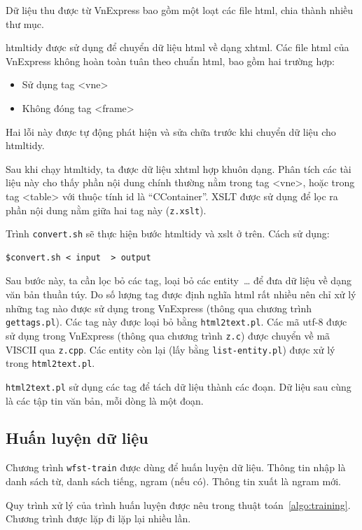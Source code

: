 \documentclass[a4paper,oneside,14pt]{extbook} %
\begin{document}
Dữ liệu thu được từ VnExpress bao gồm một loạt các file html, chia
thành nhiều thư mục.

htmltidy được sử dụng để chuyển dữ liệu html về dạng xhtml. Các file
html của VnExpress không hoàn toàn tuân theo chuẩn html, bao gồm hai
trường hợp:

\begin{itemize}
\item Sử dụng tag <vne>
\item Không đóng tag <frame>
\end{itemize}

Hai lỗi này được tự động phát hiện và sửa chữa trước khi chuyển dữ
liệu cho htmltidy.

Sau khi chạy htmltidy, ta được dữ liệu xhtml hợp khuôn dạng. Phân tích
các tài liệu này cho thấy phần nội dung chính thường nằm trong tag
<vne>, hoặc trong tag <table> với thuộc tính id là
``CContainer''. XSLT được sử dụng để lọc ra phần nội dung nằm giữa hai
tag này (\verb#z.xslt#).

Trình \verb#convert.sh# sẽ thực hiện bước htmltidy và xslt ở trên. Cách sử
dụng:
\begin{verbatim}
$convert.sh < input  > output
\end{verbatim}

Sau bước này, ta cần lọc bỏ các tag, loại bỏ các entity~\ldots{}{} để
đưa dữ liệu về dạng văn bản thuần túy. Do số lượng tag được định nghĩa
html rất nhiều nên chỉ xử lý những tag nào được sử dụng trong
VnExpress (thông qua chương trình \verb#gettags.pl#). Các tag này được loại
bỏ bằng \verb#html2text.pl#. Các mã utf-8 được sử dụng trong
VnExpress (thông qua chương trình \verb#z.c#) được chuyển về mã VISCII
qua \verb#z.cpp#. Các entity còn lại (lấy bằng \verb#list-entity.pl#)
được xử lý trong \verb#html2text.pl#.

\verb#html2text.pl# sử dụng các tag để tách dữ liệu thành các đoạn. Dữ
liệu sau cùng là các tập tin văn bản, mỗi dòng là một đoạn.

\subsection{Huấn luyện dữ liệu}
\label{sub:training-data}

Chương trình \verb#wfst-train# được dùng để huấn luyện dữ liệu. Thông
tin nhập là danh sách từ, danh sách tiếng, n\-gram (nếu có). Thông tin
xuất là n\-gram mới.

Quy trình xử lý của trình huấn luyện được nêu trong thuật
toán~\ref{algo:training}. Chương trình được lặp đi lặp lại nhiều lần. 
\end{document}
